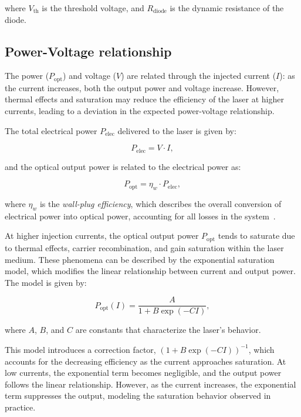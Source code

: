 \documentclass[prl,twocolumn]{revtex4-1}
\begin{document}
where \(V_{\text{th}}\) is the threshold voltage, and \(R_{\text{diode}}\) is the dynamic resistance of the diode.

\subsection{Power-Voltage relationship}

The power (\(P_{\text{opt}}\)) and voltage (\(V\)) are related through the injected current (\(I\)): as the current increases, both the output power and voltage increase. However, thermal effects and saturation may reduce the efficiency of the laser at higher currents, leading to a deviation in the expected power-voltage relationship.

The total electrical power \(P_{\text{elec}}\) delivered to the laser is given by:

\begin{equation}
P_{\text{elec}} = V \cdot I,
\end{equation}

and the optical output power is related to the electrical power as:

\begin{equation}
P_{\text{opt}} = \eta_w \cdot P_{\text{elec}},
\end{equation}

where \(\eta_w\) is the \textit{wall-plug efficiency}, which describes the overall conversion of electrical power into optical power, accounting for all losses in the system~\cite{pap2}.

At higher injection currents, the optical output power $P_{\text{opt}}$ tends to saturate due to thermal effects, carrier recombination, and gain saturation within the laser medium. These phenomena can be described by the exponential saturation model, which modifies the linear relationship between current and output power. The model is given by:

\begin{equation}
\label{eq:fit_wpe}
P_{\text{opt}}(I) = \frac{A}{1 + B \exp(-C I)},
\end{equation}

where $A$, $B$, and $C$ are constants that characterize the laser's behavior.

This model introduces a correction factor, $\left( 1 + B \exp(-C I) \right)^{-1}$, which accounts for the decreasing efficiency as the current approaches saturation. At low currents, the exponential term becomes negligible, and the output power follows the linear relationship. However, as the current increases, the exponential term suppresses the output, modeling the saturation behavior observed in practice.
\end{document}
